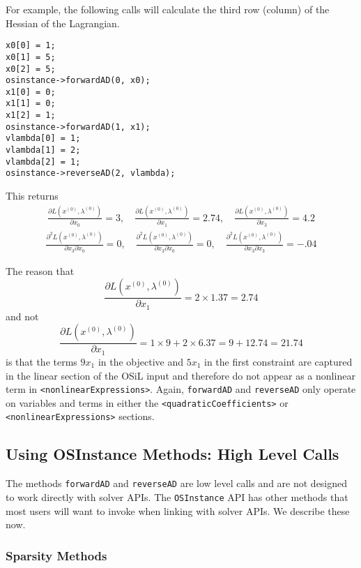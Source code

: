 \documentclass[11pt]{article}
\newcommand{\D}[2]{ \frac{\partial #1}{\partial #2} }
\newcommand{\DD}[3]{ \frac{\partial^2 #1}{\partial #2 \partial #3} }
\renewcommand{\_}{{\char"5F}}
\renewcommand{\{}{{\char"7B}}
\renewcommand{\}}{{\char"7D}}
\renewcommand{\^}{{\char"0D}}
\renewcommand{\'}{{\char"0D}}
\begin{document}
For example, the  following calls will calculate the third row (column) of the Hessian of the Lagrangian.
\begin{verbatim}
x0[0] = 1;
x0[1] = 5; 	
x0[2] = 5;
osinstance->forwardAD(0, x0);	
x1[0] = 0;
x1[1] = 0;
x1[2] = 1;
osinstance->forwardAD(1, x1);
vlambda[0] = 1;
vlambda[1] = 2;
vlambda[2] = 1;
osinstance->reverseAD(2, vlambda);
\end{verbatim}
This returns
\begin{eqnarray*}
\D{L (x^{(0)}, \lambda^{(0)})}{x_{0}} = 3, \quad  \D{L (x^{(0)}, \lambda^{(0)})}{x_{1}} = 2.74, \quad  \D{L (x^{(0)}, \lambda^{(0)})}{x_{3}} = 4.2
\end{eqnarray*}
\begin{eqnarray*}
\DD{L(x^{(0)}, \lambda^{(0)})}{x_{3}}{x_{0}} =0, \quad  \DD{L(x^{(0)}, \lambda^{(0)})}{x_{3}}{x_{0}} = 0, \quad   \DD{L(x^{(0)}, \lambda^{(0)})}{x_{3}}{x_{3}} =  -.04
\end{eqnarray*}

The reason that
$$
\D{L (x^{(0)}, \lambda^{(0)})}{x_{1}} = 2 \times 1.37 = 2.74
$$
and not
$$
\D{L (x^{(0)}, \lambda^{(0)})}{x_{1}} = 1 \times  9 + 2 \times 6.37 = 9 + 12.74 = 21.74
$$
is that the terms $9x_1$ in the objective and $5x_1$ in the first constraint
are captured in the linear section of the OSiL input and therefore do not  appear as a nonlinear term in {\tt  <nonlinearExpressions>}. Again, {\tt forwardAD} and {\tt reverseAD} only operate on variables and terms in either the {\tt <quadraticCoefficients>} or {\tt <nonlinearExpressions>} sections.

\subsection{Using OSInstance Methods: High Level Calls}

The methods {\tt forwardAD} and {\tt reverseAD} are low level calls and are not designed to work directly with solver APIs. The {\tt OSInstance} API has other methods that most users will want to invoke when linking with solver APIs.  We describe these now.


\subsubsection{Sparsity Methods}
\end{document}
